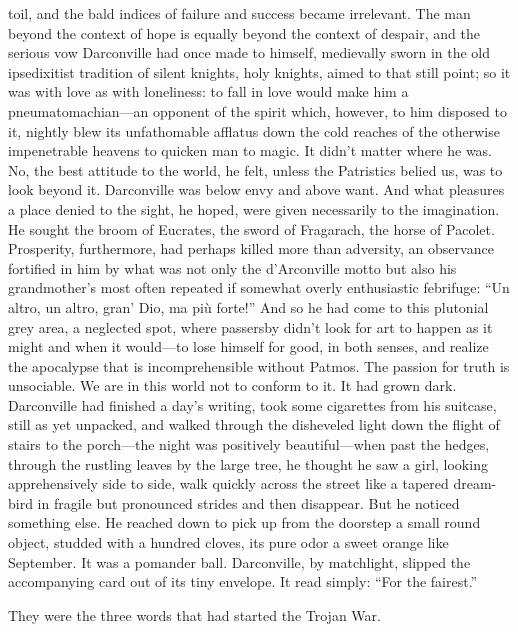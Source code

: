 toil, and the bald indices of failure and success became irrelevant. The man
beyond the context of hope is equally beyond the context of despair, and the
serious vow Darconville had once made to himself, medievally sworn in the old
ipsedixitist tradition of silent knights, holy knights, aimed to that still
point; so it was with love as with loneliness: to fall in love would make him a
pneumatomachian—an opponent of the spirit which, however, to him disposed to it,
nightly blew its unfathomable afflatus down the cold reaches of the otherwise
impenetrable heavens to quicken man to magic.
  It didn’t matter where he was. No, the best attitude to the world, he felt,
unless the Patristics belied us, was to look beyond it. Darconville was below
envy and above want. And what pleasures a place denied to the sight, he hoped,
were given necessarily to the imagination. He sought the broom of Eucrates, the
sword of Fragarach, the horse of Pacolet. Prosperity, furthermore, had perhaps
killed more than adversity, an observance fortified in him by what was not only
the d’Arconville motto but also his grandmother’s most often repeated if
somewhat overly enthusiastic febrifuge: “Un altro, un altro, gran’ Dio, ma più
forte!” And so he had come to this plutonial grey area, a neglected spot, where
passersby didn’t look for art to happen as it might and when it would—to lose
himself for good, in both senses, and realize the apocalypse that is
incomprehensible without Patmos. The passion for truth is unsociable. We are in
this world not to conform to it.
  It had grown dark.
  Darconville had finished a day’s writing, took some cigarettes from his
suitcase, still as yet unpacked, and walked through the disheveled light down
the flight of stairs to the porch—the night was positively beautiful—when past
the hedges, through the rustling leaves by the large tree, he thought he saw a
girl, looking apprehensively side to side, walk quickly across the street like a
tapered dream-bird in fragile but pronounced strides and then disappear. But he
noticed something else. He reached down to pick up from the doorstep a small
round object, studded with a hundred cloves, its pure odor a sweet orange like
September. It was a pomander ball. Darconville, by matchlight, slipped the
accompanying card out of its tiny envelope. It read simply: “For the fairest.”

  They were the three words that had started the Trojan War.
